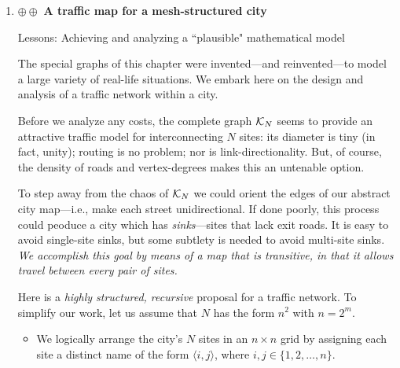 \begin{enumerate}
\medskip\item
$\oplus \oplus$
{\bf A traffic map for a mesh-structured city}

{\sc Lessons:} Achieving and analyzing a ``plausible" mathematical model

\smallskip

The special graphs of this chapter were invented---and reinvented---to model a large variety of real-life situations.  We embark here on the design and analysis of a traffic network within a city.

\smallskip

Before we analyze any costs, the complete graph $\mbox{$\cal K$}_N$ seems to provide an attractive traffic model for interconnecting $N$ sites: its diameter is tiny (in fact, unity); routing is no problem; nor is link-directionality.  But, of course, the density of roads and vertex-degrees makes this an untenable option.

\smallskip

To step away from the chaos of $\mbox{$\cal K$}_N$ we could orient the edges of our abstract city map---i.e., make each street unidirectional.  If done poorly, this process could peoduce a city which has {\em sinks}---sites that lack exit roads.  It is easy to avoid single-site sinks, but some subtlety is needed to avoid multi-site sinks.
{\em We accomplish this goal by means of a map that is {\em transitive}, in that it allows travel between every pair of sites.}

 


\medskip

Here is a {\em highly structured, recursive} proposal for a traffic network.  To simplify our work, let us assume that $N$ has the form $n^2$ with $n = 2^{m}$. 
  \begin{itemize}
  \item
We logically arrange the city's $N$ sites in an $n \times n$ grid by assigning each site a distinct name of the form $\langle i,j \rangle$, where $i, j \in \{1, 2, \ldots, n\}$.

\smallskip


\end{itemize}
\end{enumerate}
